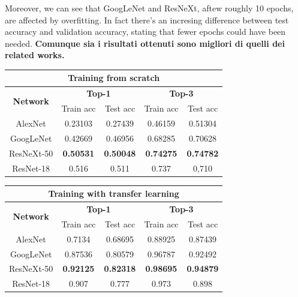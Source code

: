 \documentclass{article}
\begin{document}
Moreover, we can see that GoogLeNet and ResNeXt, aftew roughly 10 epochs, are affected by overfitting. In fact there's an incresing difference between test accuracy and validation accuracy, stating that fewer epochs could have been needed. \textbf{Comunque sia i risultati ottenuti sono migliori di quelli dei related works.}



\begin{table}[]
	\begin{tabular}{|c|c|c|c|c|}
		\hline
		\multicolumn{5}{|c|}{\textbf{Training from scratch}}                                                          \\ \hline
		\multirow{2}{*}{\textbf{Network}} & \multicolumn{2}{c|}{\textbf{Top-1}} & \multicolumn{2}{c|}{\textbf{Top-3}} \\ \cline{2-5} 
		& Train acc        & Test acc         & Train acc        & Test acc         \\ \hline
		AlexNet                           & 0.23103          & 0.27439          & 0.46159          & 0.51304          \\ \hline
		GoogLeNet                         & 0.42669          & 0.46956          & 0.68285          & 0.70628          \\ \hline
		ResNeXt-50                        & \textbf{0.50531} & \textbf{0.50048} & \textbf{0.74275} & \textbf{0.74782} \\ \hline
		ResNet-18 \cite{ArtistIdCNN406}                    & 0.516            & 0.511            & 0.737            & 0,710            \\ \hline
	\end{tabular}
	\begin{tabular}{|c|c|c|c|c|}
		\hline
		\multicolumn{5}{|c|}{\textbf{Training with transfer learning}}                                                           \\ \hline
		\multirow{2}{*}{\textbf{Network}} & \multicolumn{2}{c|}{\textbf{Top-1}}  & \multicolumn{2}{c|}{\textbf{Top-3}} \\ \cline{2-5} 
		& Train acc        & Test acc          & Train acc         & Test acc        \\ \hline
		AlexNet                           & 0.7134           & 0.68695           & 0.88925           & 0.87439         \\ \hline
		GoogLeNet                         & 0.87536          & 0.80579           & 0.96787           & 0.92492         \\ \hline
		ResNeXt-50                        & \textbf{0.92125} & \textbf{0.82318} & \textbf{0.98695}  & \textbf{0.94879} \\ \hline
		ResNet-18 \cite{ArtistIdCNN406}                    & 0.907            & 0.777             & 0.973             & 0.898           \\ \hline
	\end{tabular}
\end{table}
\end{document}

